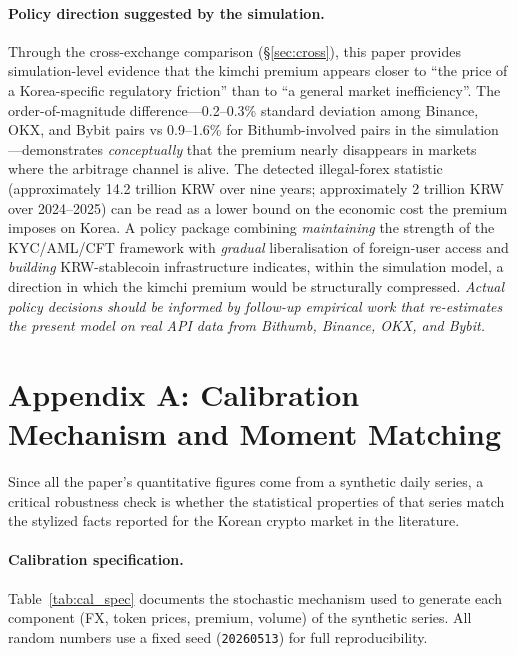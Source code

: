 \documentclass[11pt,a4paper]{article}
\begin{document}
\paragraph{Policy direction suggested by the simulation.}
Through the cross-exchange comparison (\S\ref{sec:cross}), this paper provides simulation-level
evidence that the kimchi premium appears closer to ``the price of a Korea-specific regulatory
friction'' than to ``a general market inefficiency''. The order-of-magnitude difference---0.2--0.3\%
standard deviation among Binance, OKX, and Bybit pairs vs 0.9--1.6\% for Bithumb-involved pairs in
the simulation---demonstrates \emph{conceptually} that the premium nearly disappears in markets
where the arbitrage channel is alive. The detected illegal-forex statistic (approximately 14.2
trillion KRW over nine years; approximately 2 trillion KRW over 2024--2025) can be read as a lower
bound on the economic cost the premium imposes on Korea. A policy package combining
\emph{maintaining} the strength of the KYC/AML/CFT framework with \emph{gradual} liberalisation
of foreign-user access and \emph{building} KRW-stablecoin infrastructure indicates, within the
simulation model, a direction in which the kimchi premium would be structurally compressed.
\emph{Actual policy decisions should be informed by follow-up empirical work that re-estimates
the present model on real API data from Bithumb, Binance, OKX, and Bybit.}

\appendix
\section{Appendix A: Calibration Mechanism and Moment Matching}
\label{app:calibration}

Since all the paper's quantitative figures come from a synthetic daily series, a critical robustness
check is whether the statistical properties of that series match the stylized facts reported for
the Korean crypto market in the literature.

\paragraph{Calibration specification.}
Table~\ref{tab:cal_spec} documents the stochastic mechanism used to generate each component
(FX, token prices, premium, volume) of the synthetic series. All random numbers use a fixed seed
(\texttt{20260513}) for full reproducibility.

\begin{table}[H]
\centering
\caption{Synthetic data generating mechanism (summary).}
\label{tab:cal_spec}
\small

\end{table}
\end{document}
